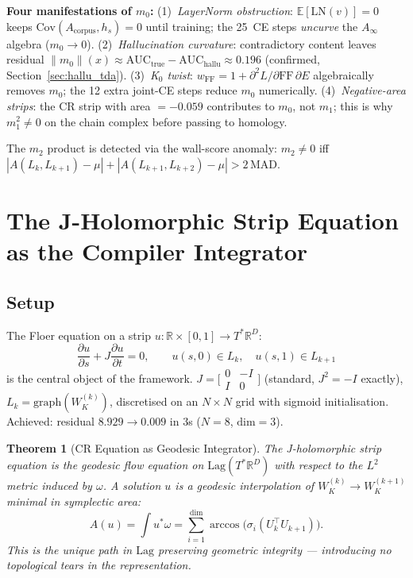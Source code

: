 \documentclass[11pt]{amsart}
\newtheorem{theorem}{Theorem}[section]
\begin{document}
\textbf{Four manifestations of $m_0$:}
(1)~\emph{LayerNorm obstruction}: $\mathbb{E}[\mathrm{LN}(v)]=0$ keeps
$\mathrm{Cov}(A_\mathrm{corpus},h_s)=0$ until training; the 25~CE steps
\emph{uncurve} the $A_\infty$ algebra ($m_0\to 0$).
(2)~\emph{Hallucination curvature}: contradictory content leaves residual
$\|m_0\|(x)\approx \mathrm{AUC}_\mathrm{true}-\mathrm{AUC}_\mathrm{hallu}\approx 0.196$
(confirmed, Section~\ref{sec:hallu_tda}).
(3)~\emph{K$_0$ twist}: $w_\mathrm{FF}=1+\partial^2L/\partial\mathrm{FF}\,\partial E$
algebraically removes $m_0$; the 12 extra joint-CE steps reduce $m_0$ numerically.
(4)~\emph{Negative-area strips}: the CR strip with area $=-0.059$
contributes to $m_0$, not $m_1$; this is why $m_1^2\neq 0$
on the chain complex before passing to homology.

The $m_2$ product is detected via the wall-score anomaly:
$m_2\neq 0$ iff $|A(L_k,L_{k+1})-\mu|+|A(L_{k+1},L_{k+2})-\mu|>2\,\mathrm{MAD}$.


\section{The J-Holomorphic Strip Equation as the Compiler Integrator}
\label{sec:cr_theorem}

\subsection{Setup}

The Floer equation on a strip $u: \mathbb{R}\times[0,1]\to T^*\mathbb{R}^D$:
\[
  \frac{\partial u}{\partial s} + J\frac{\partial u}{\partial t} = 0,
  \qquad u(s,0)\in L_k,\quad u(s,1)\in L_{k+1}
\]
is the central object of the framework.
$J = \bigl[\begin{smallmatrix}0&-I\\I&0\end{smallmatrix}\bigr]$
(standard, $J^2=-I$ exactly), $L_k = \mathrm{graph}(W_K^{(k)})$,
discretised on an $N\times N$ grid with sigmoid initialisation.
Achieved: residual $8.929\to 0.009$ in $3$s ($N=8$, $\mathrm{dim}=3$).

\begin{theorem}[CR Equation as Geodesic Integrator]
\label{thm:cr_geodesic}
The J-holomorphic strip equation is the geodesic flow equation
on $\mathrm{Lag}(T^*\mathbb{R}^D)$ with respect to the $L^2$ metric
induced by $\omega$.
A solution $u$ is a geodesic interpolation of $W_K^{(k)}\to W_K^{(k+1)}$
minimal in symplectic area:
\[
  A(u) = \int u^*\omega
  = \sum_{i=1}^{\mathrm{dim}} \arccos\bigl(\sigma_i(U_k^\top U_{k+1})\bigr).
\]
This is the unique path in $\mathrm{Lag}$ preserving geometric
integrity --- introducing no topological tears in the representation.
\end{theorem}
\end{document}
